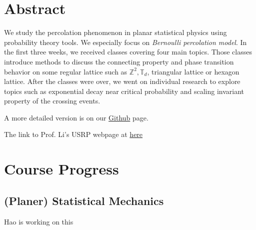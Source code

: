 \documentclass[12pt]{article}
\author{Chia-Cheng, Hao \quad Le-Rong, Hsu \quad Wei-Chieh, Hung \quad TBD \quad TBD \quad TBD}
\theoremstyle{plane}
\theoremstyle{definition}
\begin{document}
\clearpage\maketitle
\thispagestyle{empty}

\newpage
\setcounter{page}{1}
\section{Abstract}
We study the percolation phenomenon in planar statistical physics using probability theory tools. We especially focus on \textit{Bernoulli percolation model}. 
In the first three weeks, we received classes covering four main topics. Those classes introduce methods to discuss the connecting property and phase transition behavior on some regular lattice such as $\mathbb{Z}^2,\mathbb{T}_d$, triangular lattice or hexagon lattice. 
After the classes were over, we went on individual research to explore topics such as exponential decay near critical probability and scaling invariant property of the crossing events.

A more detailed version is on our \href{https://github.com/ausernamess/2022USRP-Group-7/blob/main/main.pdf}{Github} page. 

The link to Prof. Li's USRP webpage at \href{https://usrp2022.cadlag.space/}{here}
\section{Course Progress}

\setcounter{subsection}{-1}
\subsection{(Planer) Statistical Mechanics}
Hao is working on this

\end{document}
